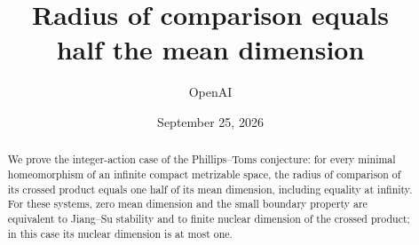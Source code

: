 \documentclass[11pt]{article}
\title{Radius of comparison equals\\half the mean dimension}
\author{OpenAI}
\date{September 25, 2026}
\theoremstyle{definition}
\theoremstyle{remark}
\numberwithin{equation}{section}
\begin{document}
\maketitle
\begin{abstract}
We prove the integer-action case of the Phillips--Toms conjecture:
for every minimal homeomorphism of an infinite compact metrizable space,
the radius of comparison of its crossed product equals one half of its
mean dimension, including equality at infinity. For these systems, zero
mean dimension and the small boundary property are equivalent to
Jiang--Su stability and to finite nuclear dimension of the crossed
product; in this case its nuclear dimension is at most one.
\end{abstract}








\begingroup
\raggedright


\endgroup
\end{document}
